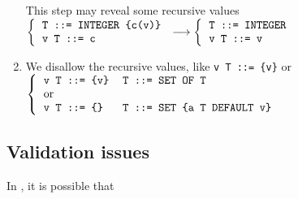 \begin{enumerate}
        This step may reveal some recursive values\\
        {\small
           $\left\{
              \begin{tabular}{l}
                 \verb+T ::= INTEGER {c(v)}+\\
                 \verb+v T ::= c+
              \end{tabular}
            \right.
           \longrightarrow
           \left\{
              \begin{tabular}{l}
                \verb+T ::= INTEGER+\\
                \verb+v T ::= v+
              \end{tabular}
            \right.$
        }

  \item We disallow the recursive values, like {\small
  \verb+v T ::= {v}+} or\\
        {\small
         $\left\{
            \begin{tabular}{ll}
                \verb+v T ::= {v}+
              & \verb+T ::= SET OF T+\\
                \textnormal{or}
              & \\
                \verb+v T ::= {}+
              & \verb+T ::= SET {a T DEFAULT v}+
            \end{tabular}
          \right.$
        }

\end{enumerate}



\subsection{Validation issues}\label{validation}

In \core, it is possible that

